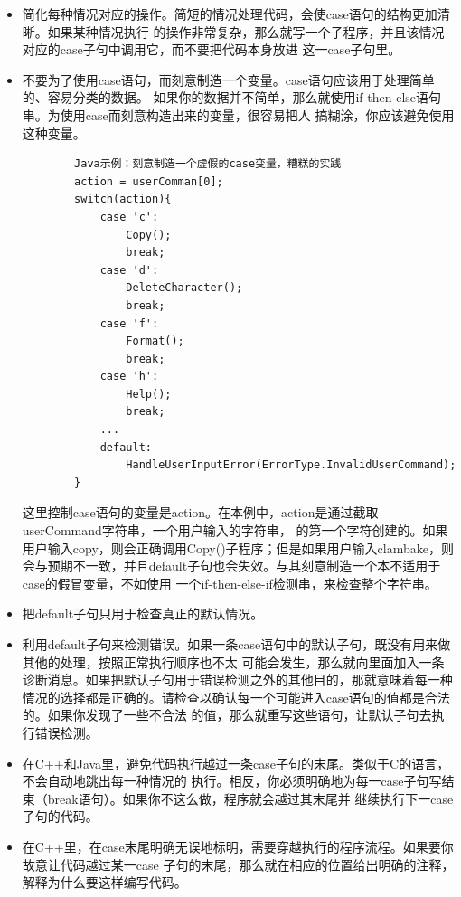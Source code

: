 \documentclass{article}
\begin{document}
\begin{itemize}
    \item 简化每种情况对应的操作。简短的情况处理代码，会使case语句的结构更加清晰。如果某种情况执行
    的操作非常复杂，那么就写一个子程序，并且该情况对应的case子句中调用它，而不要把代码本身放进
    这一case子句里。
    \item 不要为了使用case语句，而刻意制造一个变量。case语句应该用于处理简单的、容易分类的数据。
    如果你的数据并不简单，那么就使用if-then-else语句串。为使用case而刻意构造出来的变量，很容易把人
    搞糊涂，你应该避免使用这种变量。
    \begin{lstlisting}
        Java示例：刻意制造一个虚假的case变量，糟糕的实践
        action = userComman[0];
        switch(action){
            case 'c':
                Copy();
                break;
            case 'd':
                DeleteCharacter();
                break;
            case 'f':
                Format();
                break;
            case 'h':
                Help();
                break;
            ...
            default:
                HandleUserInputError(ErrorType.InvalidUserCommand);
        }
    \end{lstlisting}
    这里控制case语句的变量是action。在本例中，action是通过截取userCommand字符串，一个用户输入的字符串，
    的第一个字符创建的。如果用户输入copy，则会正确调用Copy()子程序；但是如果用户输入clambake，则
    会与预期不一致，并且default子句也会失效。与其刻意制造一个本不适用于case的假冒变量，不如使用
    一个if-then-else-if检测串，来检查整个字符串。
    \item 把default子句只用于检查真正的默认情况。
    \item 利用default子句来检测错误。如果一条case语句中的默认子句，既没有用来做其他的处理，按照正常执行顺序也不太
    可能会发生，那么就向里面加入一条诊断消息。如果把默认子句用于错误检测之外的其他目的，那就意味着每一种
    情况的选择都是正确的。请检查以确认每一个可能进入case语句的值都是合法的。如果你发现了一些不合法
    的值，那么就重写这些语句，让默认子句去执行错误检测。
    \item 在C++和Java里，避免代码执行越过一条case子句的末尾。类似于C的语言，不会自动地跳出每一种情况的
    执行。相反，你必须明确地为每一case子句写结束（break语句）。如果你不这么做，程序就会越过其末尾并
    继续执行下一case子句的代码。
    \item 在C++里，在case末尾明确无误地标明，需要穿越执行的程序流程。如果要你故意让代码越过某一case
    子句的末尾，那么就在相应的位置给出明确的注释，解释为什么要这样编写代码。
\end{itemize}
\end{document}
